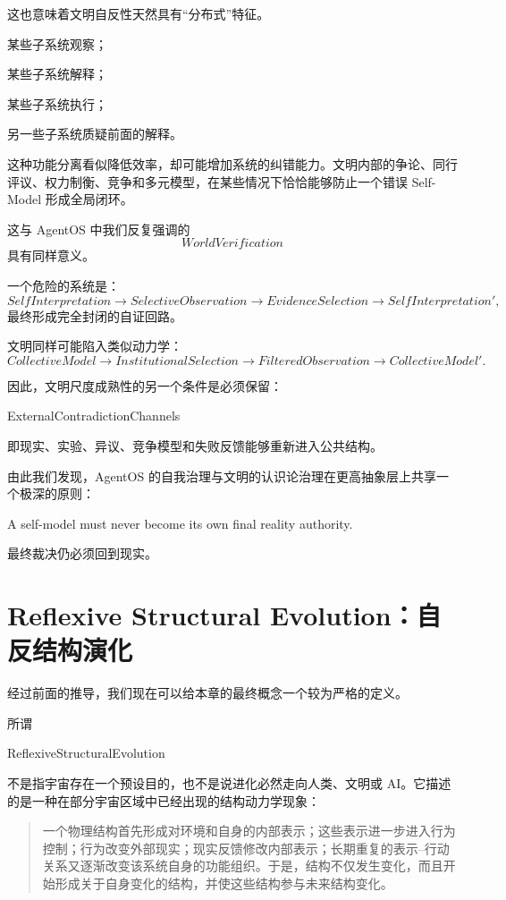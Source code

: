 这也意味着文明自反性天然具有“分布式”特征。

某些子系统观察；

某些子系统解释；

某些子系统执行；

另一些子系统质疑前面的解释。

这种功能分离看似降低效率，却可能增加系统的纠错能力。文明内部的争论、同行评议、权力制衡、竞争和多元模型，在某些情况下恰恰能够防止一个错误 Self-Model 形成全局闭环。

这与 AgentOS 中我们反复强调的
\[
WorldVerification
\]
具有同样意义。

一个危险的系统是：
\[
SelfInterpretation
\rightarrow
SelectiveObservation
\rightarrow
EvidenceSelection
\rightarrow
SelfInterpretation',
\]
最终形成完全封闭的自证回路。

文明同样可能陷入类似动力学：
\[
CollectiveModel
\rightarrow
InstitutionalSelection
\rightarrow
FilteredObservation
\rightarrow
CollectiveModel'.
\]

因此，文明尺度成熟性的另一个条件是必须保留：
\begin{statementbox}
ExternalContradictionChannels
\end{statementbox}
即现实、实验、异议、竞争模型和失败反馈能够重新进入公共结构。

由此我们发现，AgentOS 的自我治理与文明的认识论治理在更高抽象层上共享一个极深的原则：
\begin{statementbox}
A self-model must never become its own final reality authority.
\end{statementbox}

最终裁决仍必须回到现实。


\section{Reflexive Structural Evolution：自反结构演化}

经过前面的推导，我们现在可以给本章的最终概念一个较为严格的定义。

所谓
\begin{statementbox}
ReflexiveStructuralEvolution
\end{statementbox}
不是指宇宙存在一个预设目的，也不是说进化必然走向人类、文明或 AI。它描述的是一种在部分宇宙区域中已经出现的结构动力学现象：

\begin{quote}
一个物理结构首先形成对环境和自身的内部表示；这些表示进一步进入行为控制；行为改变外部现实；现实反馈修改内部表示；长期重复的表示--行动关系又逐渐改变该系统自身的功能组织。于是，结构不仅发生变化，而且开始形成关于自身变化的结构，并使这些结构参与未来结构变化。
\end{quote}

